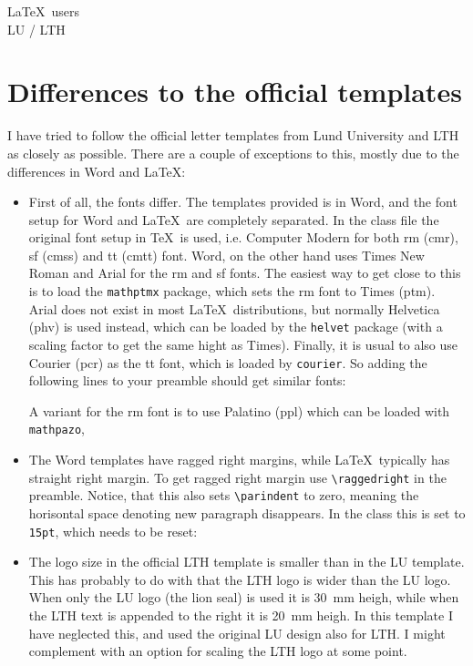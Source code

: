 \documentclass[11pt,eng,LU,logoBW]{LTHletter}
\begin{document}
\begin{letter}{\LaTeX\ users\\ LU / LTH}
  \section{Differences to the official templates}
  I have tried to follow the official letter templates from Lund University and LTH as closely as possible. There are a couple of exceptions to this, mostly due to the differences in Word and \LaTeX:
  \begin{itemize}
  \item First of all, the fonts differ. The templates provided is in Word, and the font setup for Word and \LaTeX\ are completely separated. In the class file the original font setup in \TeX\ is used, i.e. Computer Modern for both rm (cmr), sf (cmss) and tt (cmtt) font. Word, on the other hand uses Times New Roman and Arial for the rm and sf fonts. The easiest way to get close to this is to load the \texttt{mathptmx} package, which sets the rm font to Times (ptm). Arial does not exist in most \LaTeX\ distributions, but normally Helvetica (phv) is used instead, which can be loaded by the \texttt{helvet} package (with a scaling factor to get the same hight as Times). Finally, it is usual to also use Courier (pcr) as the tt font, which is loaded by \texttt{courier}. So adding the following lines to your preamble should get similar fonts:
    \begin{CodeBox}{}
\usepackage{mathptmx}
\usepackage[scaled=.93]{helvet}
\usepackage{courier}
    \end{CodeBox}
    A variant for the rm font is to use Palatino (ppl) which can be loaded with \texttt{mathpazo}, 
    \begin{CodeBox}{}
\usepackage{mathpazo}
\usepackage[scaled=.93]{helvet}
\usepackage{courier}
    \end{CodeBox}
  \item The Word templates have ragged right margins, while \LaTeX\ typically has straight right margin. To get ragged right margin use \verb|\raggedright| in the preamble. Notice, that this also sets \verb|\parindent| to zero, meaning the horisontal space denoting new paragraph disappears. In the class this is set to \texttt{15pt}, which needs to be reset:
    \begin{CodeBox}{}
\raggedright
\parindent=15pt
    \end{CodeBox}
  \item The logo size in the official LTH template is smaller than in the LU template. This has probably to do with that the LTH logo is wider than the LU logo. When only the LU logo (the lion seal) is used it is 30~mm heigh, while when the LTH text is appended to the right it is 20~mm heigh. In this template I have neglected this, and used the original LU design also for LTH. I might complement with an option for scaling the LTH logo at some point.
  \end{itemize}

\end{letter}
\end{document}
